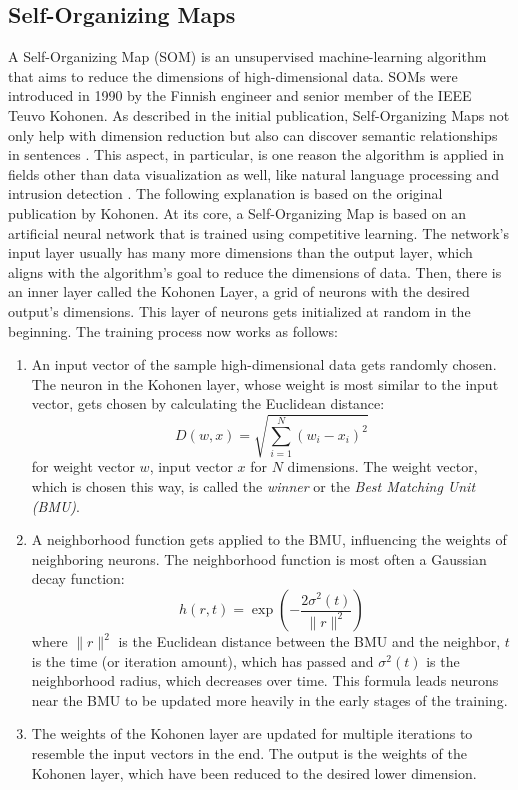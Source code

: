 \documentclass[
    fontsize=12pt,
    headings=small,
    parskip=half,           %
    bibliography=totoc,
    numbers=noenddot,       %
    open=any,               %
    ]{scrreprt}
\begin{document}
\subsection{Self-Organizing Maps}
\label{subsec:self-organizing_maps}
A Self-Organizing Map (SOM) is an unsupervised machine-learning algorithm that aims to reduce the dimensions of high-dimensional data. SOMs were introduced in 1990 by the Finnish engineer and senior member of the IEEE Teuvo Kohonen. As described in the initial publication, Self-Organizing Maps not only help with dimension reduction but also can discover semantic relationships in sentences \cite{kohonen1990self}.
This aspect, in particular, is one reason the algorithm is applied in fields other than data visualization as well, like natural language processing and intrusion detection \cite{qu2021survey}. The following explanation is based on the original publication by Kohonen. At its core, a Self-Organizing Map is based on an artificial neural network that is trained using competitive learning. The network's input layer usually has many more dimensions than the output layer, which aligns with the algorithm's goal to reduce the dimensions of data. Then, there is an inner layer called the Kohonen Layer, a grid of neurons with the desired output's dimensions. This layer of neurons gets initialized at random in the beginning. The training process now works as follows:

\begin{enumerate}
	\item An input vector of the sample high-dimensional data gets randomly chosen. The neuron in the Kohonen layer, whose weight is most similar to the input vector, gets chosen by calculating the Euclidean distance: $$D(w, x) = \sqrt{\sum_{i=1}^{N} (w_i - x_i)^2}$$ for weight vector $w$, input vector $x$ for $N$ dimensions. The weight vector, which is chosen this way, is called the \emph{winner} or the \emph{Best Matching Unit (BMU)}.
	\item A neighborhood function gets applied to the BMU, influencing the weights of neighboring neurons. The neighborhood function is most often a Gaussian decay function: $$h(r, t) = \exp\left(-\frac{2\sigma^2(t)}{\|r\|^2}\right)$$ where $\|r\|^2$ is the Euclidean distance between the BMU and the neighbor, $t$ is the time (or iteration amount), which has passed and $\sigma^2(t)$ is the neighborhood radius, which decreases over time. This formula leads neurons near the BMU to be updated more heavily in the early stages of the training.
	\item The weights of the Kohonen layer are updated for multiple iterations to resemble the input vectors in the end. The output is the weights of the Kohonen layer, which have been reduced to the desired lower dimension.
\end{enumerate}
\end{document}
